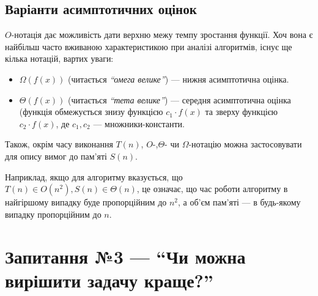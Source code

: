 \documentclass[12pt,a4paper]{report}
\begin{document}
\subsection*{Варіанти асимптотичних оцінок}

\(O\)-нотація дає можливість дати верхню межу темпу зростання функції.
Хоч вона є найбільш часто вживаною характеристикою при аналізі алгоритмів, існує ще кілька нотацій, вартих уваги:

\begin{itemize}
    \item \(\Omega(f(x))\) (читається {\itshape ``омега велике''}) --- нижня асимптотична оцінка.
    \item \(\Theta(f(x))\) (читається {\itshape ``тета велике''}) --- середня асимптотична оцінка (функція обмежується знизу функцією \(c_1 \cdot f(x)\) та зверху функцією \(c_2 \cdot f(x)\), де \(c_1, c_2\) --- множники-константи.
\end{itemize}

Також, окрім часу виконання \(T(n)\), \(O\)-,\(\Theta\)- чи \(\Omega\)-нотацію можна застосовувати для опису вимог до пам’яті \(S(n)\).

Наприклад, якщо для алгоритму вказується, що \(T(n) \in O(n^2), S(n) \in \Theta(n)\), це означає, що час роботи алгоритму в найгіршому випадку буде пропорційним до \(n^2\), а об’єм пам’яті --- в будь-якому випадку пропорційним до \(n\).



\section{Запитання №3 --- ``Чи можна вирішити задачу краще?''}
\end{document}
